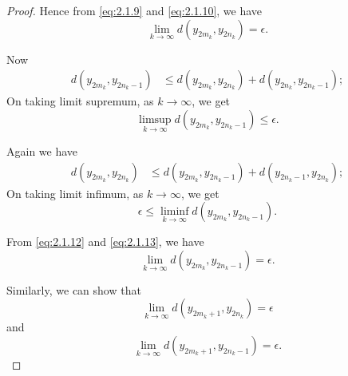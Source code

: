 \documentclass[10pt,a4paper]{amsart}
\begin{document}
\begin{proof}
Hence from \eqref{eq:2.1.9} and \eqref{eq:2.1.10}, we have
\begin{equation}\label{eq:2.1.11}
\lim_{k\to\infty} d(y_{2m_k}, y_{2n_k}) = \epsilon.
\end{equation}

Now
\begin{align*}
d(y_{2m_k}, y_{2n_k-1}) &\leq d(y_{2m_k}, y_{2n_k}) + d(y_{2n_k}, y_{2n_k-1});
\end{align*}
On taking limit supremum, as $k \to \infty$, we get
\begin{equation}\label{eq:2.1.12}
\limsup_{k\to\infty} d(y_{2m_k}, y_{2n_k-1}) \leq \epsilon.
\end{equation}

Again we have
\begin{align*}
d(y_{2m_k}, y_{2n_k}) &\leq d(y_{2m_k}, y_{2n_k-1}) + d(y_{2n_k-1}, y_{2n_k});
\end{align*}
On taking limit infimum, as $k \to \infty$, we get
\begin{equation}\label{eq:2.1.13}
\epsilon \leq \liminf_{k\to\infty} d(y_{2m_k}, y_{2n_k-1}).
\end{equation}

From \eqref{eq:2.1.12} and \eqref{eq:2.1.13}, we have
\begin{equation}\label{eq:2.1.14}
\lim_{k\to\infty} d(y_{2m_k}, y_{2n_k-1}) = \epsilon.
\end{equation}

Similarly, we can show that
\begin{equation}\label{eq:2.1.15}
\lim_{k\to\infty} d(y_{2m_k+1}, y_{2n_k}) = \epsilon
\end{equation}
and
\begin{equation}\label{eq:2.1.16}
\lim_{k\to\infty} d(y_{2m_k+1}, y_{2n_k-1}) = \epsilon.
\end{equation}


\end{proof}
\end{document}
